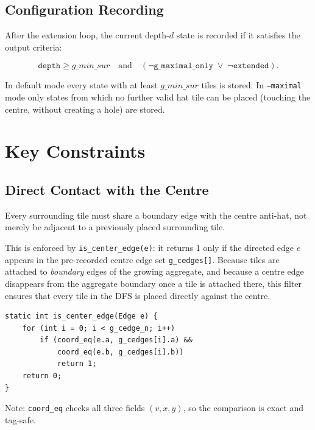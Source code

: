 \documentclass[10pt,a4paper]{article}
\let\polysection\section
\renewcommand\section{\needspace{0.16\textheight}\polysection}
\let\polysubsection\subsection
\renewcommand\subsection{\needspace{0.12\textheight}\polysubsection}
\newcommand{\code}[1]{\texttt{\small #1}}
\begin{document}
\subsection{Configuration Recording}

After the extension loop, the current depth-$d$ state is recorded if it
satisfies the output criteria:

\begin{equation*}
  \texttt{depth} \ge g\_min\_sur
  \quad\text{and}\quad
  (\lnot\texttt{g\_maximal\_only} \;\lor\; \lnot\texttt{extended}).
\end{equation*}

In default mode every state with at least \(g\_min\_sur\) tiles is
stored.  In \code{--maximal} mode only states from which no further
valid hat tile can be placed (touching the centre, without creating a
hole) are stored.

\section{Key Constraints}

\subsection{Direct Contact with the Centre}

Every surrounding tile must share a boundary edge with the centre
anti-hat, not merely be adjacent to a previously placed surrounding
tile.

This is enforced by \code{is\_center\_edge(e)}: it returns 1 only if
the directed edge $e$ appears in the pre-recorded centre edge set
\code{g\_cedges[]}.  Because tiles are attached to \emph{boundary}
edges of the growing aggregate, and because a centre edge disappears
from the aggregate boundary once a tile is attached there, this
filter ensures that every tile in the DFS is placed directly against
the centre.

\begin{verbatim}
static int is_center_edge(Edge e) {
    for (int i = 0; i < g_cedge_n; i++)
        if (coord_eq(e.a, g_cedges[i].a) &&
            coord_eq(e.b, g_cedges[i].b))
            return 1;
    return 0;
}
\end{verbatim}

\noindent Note: \code{coord\_eq} checks all three fields $(v, x, y)$,
so the comparison is exact and tag-safe.
\end{document}
